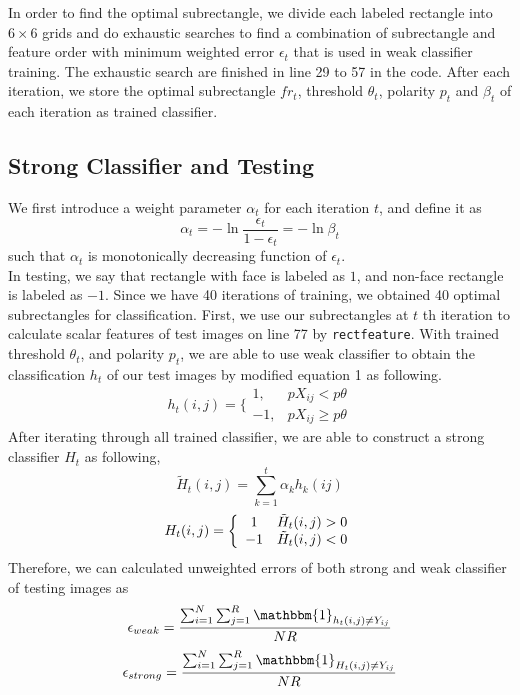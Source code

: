 \documentclass{article}
\begin{document}
	\justify In order to find the optimal subrectangle, we divide each labeled rectangle into $6\times6$ grids and do exhaustic searches to find a combination of subrectangle and feature order with minimum weighted error $\epsilon_t$ that is used in weak classifier training. The exhaustic search are finished in line 29 to 57 in the code. After each iteration, we store the optimal subrectangle $fr_t$, threshold $\theta_t$, polarity $p_t$ and $\beta_t$ of each iteration as trained classifier.
	
	\subsection{Strong Classifier and Testing}
	\justify We first introduce a weight parameter $\alpha_t$ for each iteration $t$, and define it as
	\begin{equation}
	\alpha_t=-\ln\frac{\epsilon_t}{1-\epsilon_t}=-\ln\beta_t
	\end{equation}
	such that $\alpha_t$ is monotonically decreasing function of $\epsilon_t$.\\
	
	\justify In testing, we say that rectangle with face is labeled as $1$, and non-face rectangle is labeled as $-1$. Since we have 40 iterations of training, we obtained 40 optimal subrectangles for classification. First, we use our subrectangles at $t$ th iteration to calculate scalar features of test images on line 77 by \texttt{rectfeature}. With trained threshold $\theta_t$, and polarity $p_t$,  we are able to use weak classifier to obtain the classification $h_t$ of our test images by modified equation 1 as following.
	\begin{equation}
	h_t(i,j)=\bigg\{\begin{array}{cc}
	1,& p{X}_{ij}<p\theta\\
	-1,& p{X}_{ij}\geq p\theta
	\end{array}
	\end{equation}
	After iterating through all trained classifier, we are able to construct a strong classifier $H_t$ as following,
	\begin{equation}
	\tilde{H}_t(i,j)=\sum_{k=1}^{t}\alpha_kh_k(ij)
	\end{equation}
	\begin{equation}
    H_t(i,j)=\bigg\{\begin{array}{c c}
    1 & \tilde{H}_t(i,j)>0\\
    -1 & \tilde{H}_t(i,j)<0
    \end{array}
	\end{equation}
	 Therefore, we can calculated unweighted errors of both strong and weak classifier of testing images as
	 \begin{equation}
	 \epsilon_{weak}=\frac{\sum_{i=1}^N\sum_{j=1}^R\mathbbm{1}_{h_t(i,j)\neq Y_{ij}}}{NR}
	 \end{equation}
	 \begin{equation}
	 \epsilon_{strong}=\frac{\sum_{i=1}^N\sum_{j=1}^R\mathbbm{1}_{H_t(i,j)\neq Y_{ij}}}{NR}
	 \end{equation}
	
\end{document}
